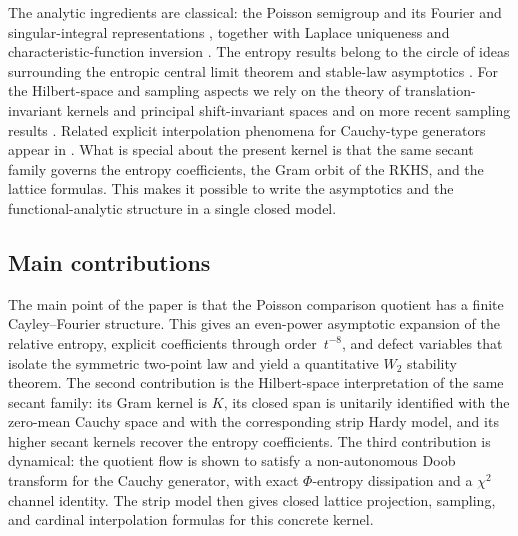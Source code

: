 The analytic ingredients are classical: the Poisson semigroup and its
Fourier and singular-integral representations
\cite{Folland1995,Grafakos2014,Stein1971,Kwasnicki2017}, together with Laplace
uniqueness and characteristic-function inversion
\cite{Widder1941,Lukacs1970,Feller1971}.  The entropy results belong to
the circle of ideas surrounding the entropic central limit theorem and
stable-law asymptotics
\cite{Barron1986,JohnsonBarron2004,ArtsteinBallBartheNaor2004,CarlenCarvalho1992,BobkovChistyakovGotzeEdgeworth2013,BobkovChistyakovGotzeBerryEsseen2014,BobkovChistyakovGotze2013,ToscaniFractionalFisher2016,Toscani2016}.
For the Hilbert-space and sampling aspects we rely on the theory of
translation-invariant kernels and principal shift-invariant spaces
\cite{Aronszajn1950,deBoorDeVoreRon1994,RonShen1995,Bownik2000,AldroubiGrochenig2001}
and on more recent sampling results
\cite{GrochenigRomeroStockler2018,GrochenigRomeroStockler2020,FuhrGrochenigHaimiKlotzRomero2017}.
Related explicit interpolation phenomena for Cauchy-type generators
appear in
\cite{KiselevMininNovikov2016,KiselevMininNovikov2019,BelovKulikovLyubarskii2022,BelovKulikovLyubarskii2023,UlanovskiiZlotnikov2025}.
What is special about the present kernel is that the same secant family
governs the entropy coefficients, the Gram orbit of the RKHS, and the
lattice formulas.  This makes it possible to write the asymptotics and
the functional-analytic structure in a single closed model.

\subsection{Main contributions}

The main point of the paper is that the Poisson comparison quotient has
a finite Cayley--Fourier structure.  This gives an even-power asymptotic
expansion of the relative entropy, explicit coefficients through
order~$t^{-8}$, and defect variables that isolate the symmetric
two-point law and yield a quantitative $W_2$ stability theorem.  The
second contribution is the Hilbert-space interpretation of the same
secant family: its Gram kernel is $K$, its closed span is unitarily
identified with the zero-mean Cauchy space and with the corresponding
strip Hardy model, and its higher secant kernels recover the entropy
coefficients.  The third contribution is dynamical: the quotient flow is
shown to satisfy a non-autonomous Doob transform for the Cauchy
generator, with exact $\Phi$-entropy dissipation and a $\chi^2$ channel
identity.  The strip model then gives closed lattice projection,
sampling, and cardinal interpolation formulas for this concrete kernel.

